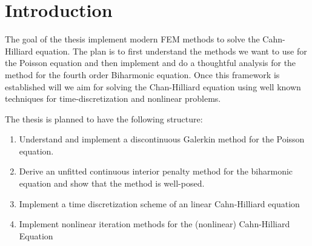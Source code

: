 \section{Introduction}\label{sec:introduction}
The goal of the thesis implement modern FEM methods to solve the Cahn-Hilliard equation. The plan is to first understand the methods we want to use for the Poisson equation and then implement and do a thoughtful analysis for the method for the fourth order Biharmonic equation. Once this framework is established will we aim for solving the Chan-Hilliard equation using well known techniques for time-discretization and nonlinear problems.


The thesis is planned to have the following structure:


\begin{enumerate}[label=(\alph*)]
    \item
 Understand and implement a discontinuous Galerkin method for the Poisson equation.
    \item
 Derive an unfitted continuous interior penalty method for the biharmonic equation and show that the method is well-posed.
    \item
 Implement a time discretization scheme of an linear Cahn-Hilliard equation
    \item
 Implement nonlinear iteration methods for the (nonlinear) Cahn-Hilliard Equation
\end{enumerate}


